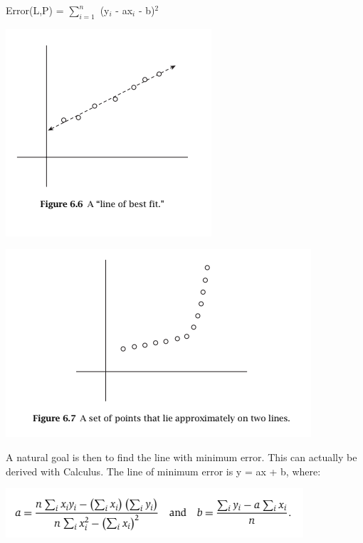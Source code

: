\documentclass{article}
\begin{document}
\begin{center}
   Error(L,P) = $\sum_{i = 1}^{n}$ (y$_i$ - ax$_i$ - b)$^2$
\end{center}

\begin{center}
    \includegraphics[]{figures/fig10.png}
\end{center}

\begin{center}
    \includegraphics[]{figures/fig11.png}
\end{center}

A natural goal is then to find the line with minimum error. This can actually be derived with Calculus. The line of minimum error is y = ax + b, where:\\

\begin{center}
    \includegraphics[]{figures/fig12.png}
\end{center}
\end{document}
